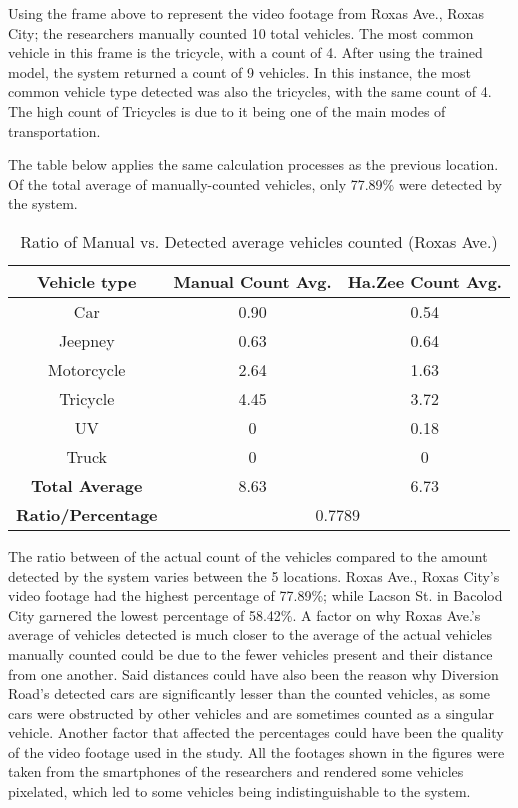 Using the frame above to represent the video footage from  Roxas Ave., Roxas City; the researchers manually counted 10 total vehicles. The most common vehicle in this frame is the tricycle, with a count of 4. After using the trained model, the system returned a count of 9 vehicles. In this instance, the most common vehicle type detected was also the tricycles, with the same count of 4. The high count of Tricycles is due to it being one of the main modes of transportation.

The table below applies the same calculation processes as the previous location. Of the total average of manually-counted vehicles, only 77.89\% were detected by the system. 



\begin{table}[ht]   %
	\centering
	\caption{Ratio of Manual vs. Detected average vehicles counted  (Roxas Ave.)} \vspace{0.25em}
	\begin{tabular}{c|c|c} \hline
		\centering \textbf {Vehicle type} & \textbf{Manual Count Avg.} & \textbf{Ha.Zee Count Avg.} \\ \hline
		Car & 0.90 & 0.54   \\ \hline
		Jeepney & 0.63 & 0.64  	\\ \hline
		Motorcycle& 2.64  & 1.63  \\ \hline
		Tricycle   & 4.45  & 3.72 \\ \hline
		UV & 0 & 0.18  \\ \hline
		Truck & 0 & 0 \\ \hline
		
		\textbf{Total Average} & 8.63 & 6.73 \\ \hline
		\textbf{Ratio/Percentage} & \multicolumn{2}{c}{0.7789}  \\ \hline
		
		
	\end{tabular}
	\label{tab:roxas_ave}
\end{table}

The ratio between of the actual count of the vehicles compared to the amount detected by the system varies between the 5 locations. Roxas Ave., Roxas City’s video footage had the highest percentage of 77.89\%; while Lacson St. in Bacolod City garnered the lowest percentage of 58.42\%. A factor on why Roxas Ave.’s average of vehicles detected is much closer to the average of the actual vehicles manually counted could be due to the fewer vehicles present and their distance from one another. Said distances could have also been the reason why Diversion Road’s detected cars are significantly lesser than the counted vehicles, as some cars were obstructed by other vehicles and are sometimes counted as a singular vehicle. Another factor that affected the percentages could have been the quality of the video footage used in the study. All the footages shown in the figures were taken from the smartphones of the researchers and rendered some vehicles pixelated, which led to some vehicles being indistinguishable to the system. 



